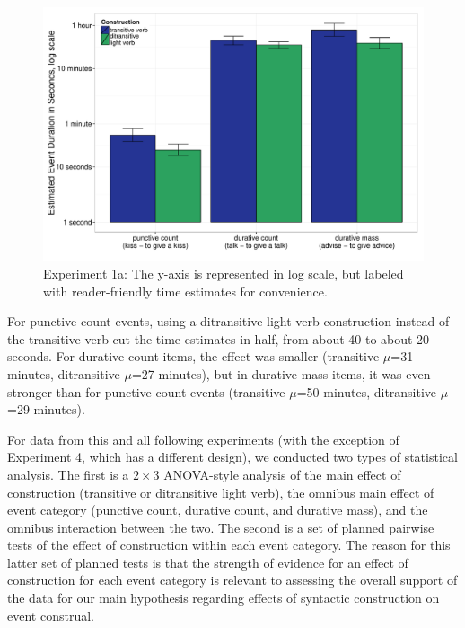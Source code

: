 \documentclass[review,12pt,authoryear]{elsarticle}
\begin{document}
\begin{figure}[ht!]
\centering
\includegraphics[width=\textwidth]{./Figures/Exp1a_AllEventsBar.pdf}
\caption{Experiment 1a: The y-axis is represented in log scale, but labeled with reader-friendly time estimates for convenience. }
\label{fig_resOE}
\end{figure}

For punctive count events, using a ditransitive light verb construction instead of the transitive verb cut the time estimates in half, from about 40 to about 20 seconds. For durative count items, the effect was smaller (transitive $\mu$=31 minutes, ditransitive $\mu$=27 minutes), but in durative mass items, it was even stronger than for punctive count events (transitive $\mu$=50 minutes, ditransitive $\mu$=29 minutes).

For data from this and all following experiments (with the exception of Experiment 4, which has a different design), we conducted two types of statistical analysis. The first is a $2 \times 3$ ANOVA-style analysis of the main effect of construction (transitive or ditransitive light verb), the omnibus main effect of event category (punctive count, durative count, and durative mass), and the omnibus interaction between the two. The second is a set of planned pairwise tests of the effect of construction within each event category.  The reason for this latter set of planned tests is that the strength of evidence for an effect of construction for each event category is relevant to assessing the overall support of the data for our main hypothesis regarding effects of syntactic construction on event construal.  
\end{document}
